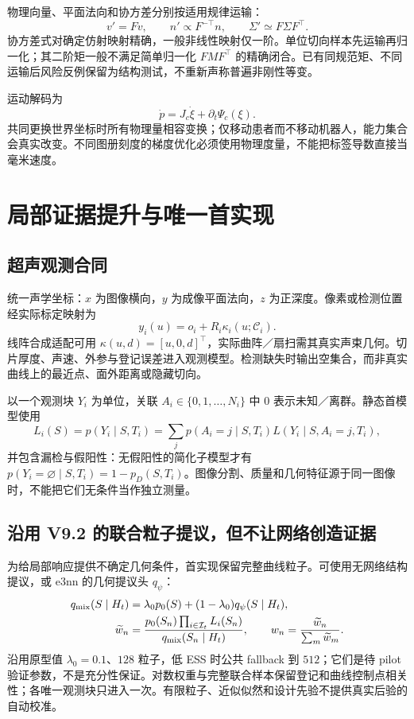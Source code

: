 \documentclass[UTF8,fontset=fandol,11pt,a4paper]{ctexart}
\theoremstyle{plain}
\theoremstyle{definition}
\theoremstyle{remark}
\numberwithin{equation}{section}
\begin{document}
物理向量、平面法向和协方差分别按适用规律运输：
\begin{equation}
v'=Fv,\qquad n'\propto F^{-\top}n,\qquad \Sigma'\simeq F\Sigma F^\top.
\end{equation}
协方差式对确定仿射映射精确，一般非线性映射仅一阶。单位切向样本先运输再归一化；其二阶矩一般不满足简单归一化 $FMF^\top$ 的精确闭合。已有同规范矩、不同运输后风险反例保留为结构测试，不重新声称普遍非刚性等变。

运动解码为
\begin{equation}
\dot p=J_c\dot\xi+\partial_t\Psi_c(\xi).
\end{equation}
共同更换世界坐标时所有物理量相容变换；仅移动患者而不移动机器人，能力集合会真实改变。不同图册刻度的梯度优化必须使用物理度量，不能把标签导数直接当毫米速度。

\section{局部证据提升与唯一首实现}
\label{sec:belief}
\subsection{超声观测合同}
统一声学坐标：$x$ 为图像横向，$y$ 为成像平面法向，$z$ 为正深度。像素或检测位置经实际标定映射为
\begin{equation}
y_i(u)=o_i+R_i\kappa_i(u;\mathcal C_i).
\end{equation}
线阵合成适配可用 $\kappa(u,d)=[u,0,d]^\top$，实际曲阵／扇扫需其真实声束几何。切片厚度、声速、外参与登记误差进入观测模型。检测缺失时输出空集合，而非真实曲线上的最近点、面外距离或隐藏切向。

以一个观测块 $Y_i$ 为单位，关联 $A_i\in\{0,1,\dots,N_i\}$ 中 $0$ 表示未知／离群。静态首模型使用
\begin{equation}
L_i(S)=p(Y_i\mid S,T_i)=\sum_j p(A_i=j\mid S,T_i)L(Y_i\mid S,A_i=j,T_i),
\end{equation}
并包含漏检与假阳性：无假阳性的简化子模型才有 $p(Y_i=\varnothing\mid S,T_i)=1-p_D(S,T_i)$。图像分割、质量和几何特征源于同一图像时，不能把它们无条件当作独立测量。

\subsection{沿用 V9.2 的联合粒子提议，但不让网络创造证据}
为给局部响应提供不确定几何条件，首实现保留完整曲线粒子。可使用无网络结构提议，或 e3nn 的几何提议头 $q_\psi$：
\begin{align}
q_{\rm mix}(S\mid H_t)&=\lambda_0p_0(S)+(1-\lambda_0)q_\psi(S\mid H_t),\\
\widetilde w_n&=\frac{p_0(S_n)\prod_{i\in\mathcal I_t}L_i(S_n)}{q_{\rm mix}(S_n\mid H_t)},
\qquad w_n=\frac{\widetilde w_n}{\sum_m\widetilde w_m}.
\label{eq:importance}
\end{align}
沿用原型值 $\lambda_0=0.1$、$128$ 粒子，低 ESS 时公共 fallback 到 $512$；它们是待 pilot 验证参数，不是充分性保证。对数权重与完整联合样本保留登记和曲线控制点相关性；各唯一观测块只进入一次。有限粒子、近似似然和设计先验不提供真实后验的自动校准。
\end{document}

